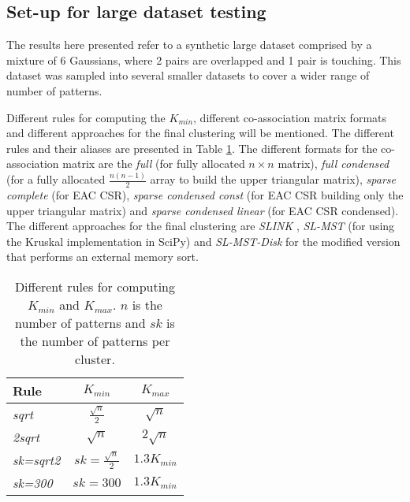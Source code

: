 \subsection{Set-up for large dataset testing}
The results here presented refer to a synthetic large dataset comprised by a mixture of 6 Gaussians, where 2 pairs are overlapped and 1 pair is touching.
This dataset was sampled into several smaller datasets to cover a wider range of number of patterns.

Different rules for computing the $K_{min}$, different co-association matrix formats and different approaches for the final clustering will be mentioned.
The different rules and their aliases are presented in Table \ref{tab:eac rules}.
The different formats for the co-association matrix are the \emph{full} (for fully allocated $n \times n$ matrix), \emph{full condensed} (for a fully allocated $\frac{n(n-1)}{2}$ array to build the upper triangular matrix), \emph{sparse complete} (for EAC CSR), \emph{sparse condensed const} (for EAC CSR building only the upper triangular matrix) and \emph{sparse condensed linear} (for EAC CSR condensed).
The different approaches for the final clustering are \emph{SLINK} \cite{Sibson1973}, \emph{SL-MST} (for using the Kruskal implementation in SciPy) and \emph{SL-MST-Disk} for the modified version that performs an external memory sort.

\begin{table}[h]
\centering
\caption{Different rules for computing $K_{min}$ and $K_{max}$. $n$ is the number of patterns and $sk$ is the number of patterns per cluster.}

\begin{tabular}{lcc}
\toprule
Rule &  $K_{min}$ &  $K_{max}$ \\
\midrule
\emph{sqrt}     & $\frac{\sqrt{n}}{2}$      & $\sqrt{n}$    \\
\emph{2sqrt}    & $\sqrt{n}$                & $2 \sqrt{n}$  \\
\emph{sk=sqrt2} & $sk = \frac{\sqrt{n}}{2}$ & $1.3 K_{min}$ \\
\emph{sk=300}   & $sk = 300$                & $1.3 K_{min}$ \\
\bottomrule
\end{tabular}

\label{tab:eac rules}
\end{table}


